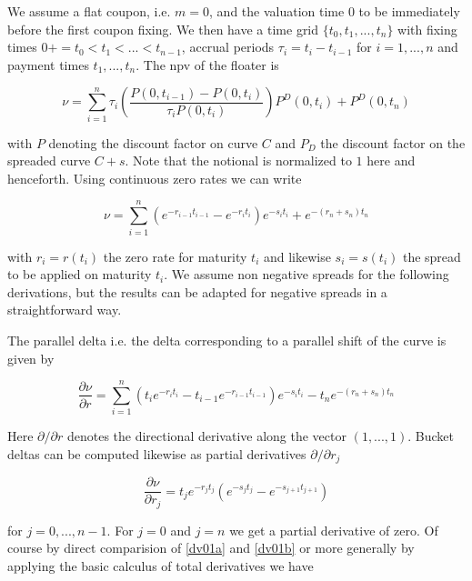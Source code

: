 \documentclass{amsart}
\theoremstyle{plain}
\numberwithin{equation}{section}
\begin{document}
We assume a flat coupon, i.e. $m=0$, and the valuation time $0$ to be immediately before the first coupon fixing. We then have a time grid $\{t_0, t_1, ... , t_n\}$ with fixing times $0+ = t_0 < t_1 < ... < t_{n-1}$, accrual periods $\tau_i = t_i - t_{i-1}$ for $i=1,...,n$ and payment times $t_1, ... , t_n$. The npv of the floater is

\begin{equation}
\nu = \sum_{i=1}^n \tau_i \left( \frac{P(0,t_{i-1})-P(0,t_i)}{\tau_i P(0,t_i)} \right) P^D(0,t_i) + P^D(0,t_n)
\end{equation}

with $P$ denoting the discount factor on curve $C$ and $P_D$ the discount factor on the spreaded curve $C+s$. Note that the notional is normalized to $1$ here and henceforth. Using continuous zero rates we can write

\begin{equation}\label{npva}
\nu = \sum_{i=1}^n (e^{-r_{i-1} t_{i-1}} - e^{-r_i t_i}) e^{-s_i t_i} + e^{-(r_n+s_n) t_n}
\end{equation}

with $r_i = r(t_i)$ the zero rate for maturity $t_i$ and likewise $s_i=s(t_i)$ the spread to be applied on maturity $t_i$.  We assume non negative spreads for the following derivations, but the results can be adapted for negative spreads in a straightforward way. 

The parallel delta i.e. the delta corresponding to a parallel shift of the curve is given by

\begin{equation}\label{dv01a}
\frac{\partial \nu}{\partial r} =  \sum_{i=1}^n ( t_i e^{- r_i t_i} - t_{i-1} e^{- r_{i-1} t_{i-1}}) e^{-s_i t_i} - t_n e^{-(r_n+s_n) t_n}   
\end{equation}

Here $\partial / \partial r$ denotes the directional derivative along the vector $(1,...,1)$. Bucket deltas can be computed likewise as partial derivatives $\partial / \partial r_j$ 

\begin{equation}\label{dv01b}
\frac{\partial \nu}{\partial r_j} =  t_je^{-r_jt_j} ( e^{-s_jt_j} - e^{-s_{j+1} t_{j+1}})
\end{equation}

for $j = 0,...,n-1$. For $j=0$ and $j=n$ we get a partial derivative of zero. Of course by direct comparision of \ref{dv01a} and \ref{dv01b} or more generally by applying the basic calculus of total derivatives we have
\end{document}
